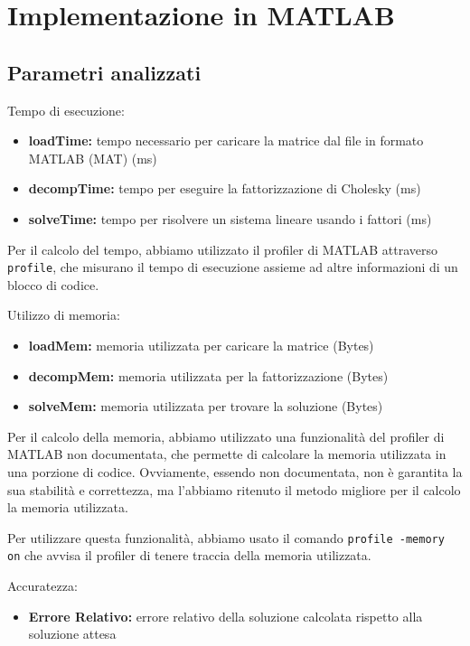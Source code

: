 \section{Implementazione in MATLAB}

\subsection{Parametri analizzati}

Tempo di esecuzione:
\begin{itemize}
    \item \textbf{loadTime:} tempo necessario per caricare la matrice dal file in formato MATLAB (MAT) (\unit{\milli\second})
    \item \textbf{decompTime:} tempo per eseguire la fattorizzazione di Cholesky (\unit{\milli\second})
    \item \textbf{solveTime:} tempo per risolvere un sistema lineare usando i fattori (\unit{\milli\second})
\end{itemize}

Per il calcolo del tempo, abbiamo utilizzato il profiler di MATLAB attraverso \texttt{profile},
che misurano il tempo di esecuzione assieme ad altre informazioni di un blocco di codice.

Utilizzo di memoria:
\begin{itemize}
    \item \textbf{loadMem:} memoria utilizzata per caricare la matrice (Bytes)
    \item \textbf{decompMem:} memoria utilizzata per la fattorizzazione (Bytes)
    \item \textbf{solveMem:} memoria utilizzata per trovare la soluzione (Bytes)
\end{itemize}

Per il calcolo della memoria, abbiamo utilizzato una funzionalità del profiler di MATLAB non documentata,
che permette di calcolare la memoria utilizzata in una porzione di codice. Ovviamente, essendo non documentata, non
è garantita la sua stabilità e correttezza, ma l'abbiamo ritenuto il metodo migliore per il calcolo la memoria
utilizzata.

Per utilizzare questa funzionalità, abbiamo usato il comando \texttt{profile -memory on} che avvisa il profiler di tenere traccia
della memoria utilizzata.

Accuratezza:
\begin{itemize}
    \item \textbf{Errore Relativo:} errore relativo della soluzione calcolata rispetto alla soluzione attesa
\end{itemize}

